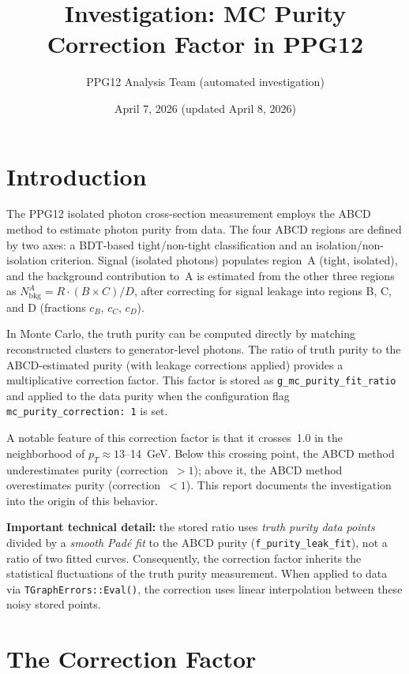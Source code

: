 \documentclass[11pt,a4paper]{article}
\title{Investigation: MC Purity Correction Factor in PPG12}
\author{PPG12 Analysis Team (automated investigation)}
\date{April 7, 2026 (updated April 8, 2026)}
\begin{document}
\maketitle

\section{Introduction}
\label{sec:introduction}

The PPG12 isolated photon cross-section measurement employs the ABCD method
to estimate photon purity from data. The four ABCD regions are defined by
two axes: a BDT-based tight/non-tight classification and an
isolation/non-isolation criterion. Signal (isolated photons) populates
region~A (tight, isolated), and the background contribution to~A is
estimated from the other three regions as
$N_{\mathrm{bkg}}^{A} = R \cdot (B \times C) / D$,
after correcting for signal leakage into regions B, C, and D
(fractions $c_B$, $c_C$, $c_D$).

In Monte Carlo, the truth purity can be computed directly by matching
reconstructed clusters to generator-level photons. The ratio of truth
purity to the ABCD-estimated purity (with leakage corrections applied)
provides a multiplicative correction factor. This factor is stored as
\texttt{g\_mc\_purity\_fit\_ratio} and applied to the data purity when the
configuration flag \texttt{mc\_purity\_correction:~1} is set.

A notable feature of this correction factor is that it crosses~1.0 in the
neighborhood of $p_T \approx 13$--14~GeV. Below this crossing point, the
ABCD method underestimates purity (correction~$>1$); above it, the ABCD
method overestimates purity (correction~$<1$). This report documents the
investigation into the origin of this behavior.

\textbf{Important technical detail:} the stored ratio uses \emph{truth purity
data points} divided by a \emph{smooth Pad\'e fit} to the ABCD purity
(\texttt{f\_purity\_leak\_fit}), not a ratio of two fitted curves.
Consequently, the correction factor inherits the statistical fluctuations
of the truth purity measurement. When applied to data via
\texttt{TGraphErrors::Eval()}, the correction uses linear interpolation
between these noisy stored points.

\section{The Correction Factor}
\label{sec:correction}
\end{document}
